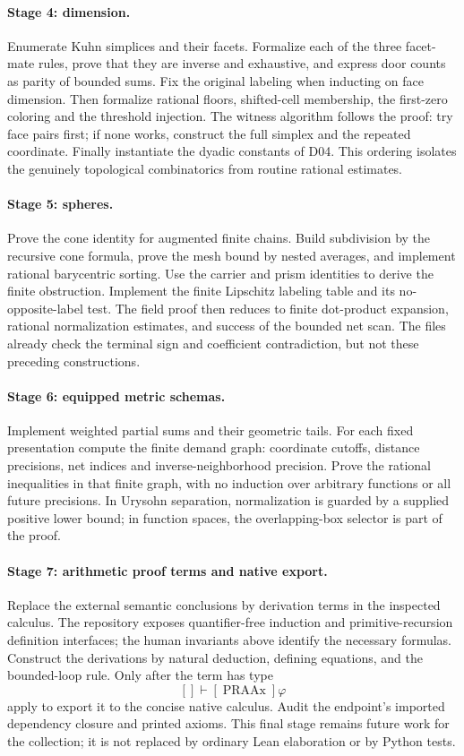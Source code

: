 \paragraph{Stage 4: dimension.}
Enumerate Kuhn simplices and their facets. Formalize each of the three facet-mate rules, prove that they are inverse and exhaustive, and express door counts as parity of bounded sums. Fix the original labeling when inducting on face dimension. Then formalize rational floors, shifted-cell membership, the first-zero coloring and the threshold injection. The witness algorithm follows the proof: try face pairs first; if none works, construct the full simplex and the repeated coordinate. Finally instantiate the dyadic constants of D04. This ordering isolates the genuinely topological combinatorics from routine rational estimates.

\paragraph{Stage 5: spheres.}
Prove the cone identity for augmented finite chains. Build subdivision by the recursive cone formula, prove the mesh bound by nested averages, and implement rational barycentric sorting. Use the carrier and prism identities to derive the finite obstruction. Implement the finite Lipschitz labeling table and its no-opposite-label test. The field proof then reduces to finite dot-product expansion, rational normalization estimates, and success of the bounded net scan. The files already check the terminal sign and coefficient contradiction, but not these preceding constructions.

\paragraph{Stage 6: equipped metric schemas.}
Implement weighted partial sums and their geometric tails. For each fixed presentation compute the finite demand graph: coordinate cutoffs, distance precisions, net indices and inverse-neighborhood precision. Prove the rational inequalities in that finite graph, with no induction over arbitrary functions or all future precisions. In Urysohn separation, normalization is guarded by a supplied positive lower bound; in function spaces, the overlapping-box selector is part of the proof.

\paragraph{Stage 7: arithmetic proof terms and native export.}
Replace the external semantic conclusions by derivation terms in the inspected  calculus. The repository exposes quantifier-free induction and primitive-recursion definition interfaces; the human invariants above identify the necessary formulas. Construct the derivations by natural deduction, defining equations, and the bounded-loop rule. Only after the term has type
\[
 []\vdash[\operatorname{PRAAx}]\varphi
\]
apply  to export it to the concise native calculus. Audit the endpoint's imported dependency closure and printed axioms. This final stage remains future work for the collection; it is not replaced by ordinary Lean elaboration or by Python tests.

